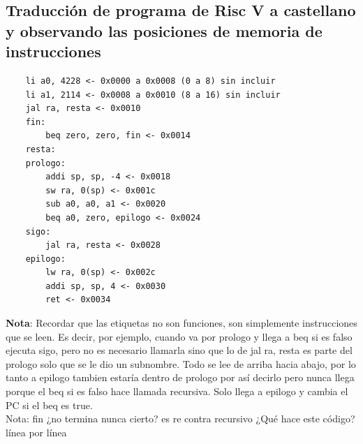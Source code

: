 \documentclass[10pt,a4paper]{article}
\begin{document}
\subsection*{Traducción de programa de Risc V a castellano y observando las posiciones de memoria de instrucciones}
\label{subsec:TPRVC}
\begin{lstlisting}
    li a0, 4228 <- 0x0000 a 0x0008 (0 a 8) sin incluir
    li a1, 2114 <- 0x0008 a 0x0010 (8 a 16) sin incluir
    jal ra, resta <- 0x0010
    fin: 
        beq zero, zero, fin <- 0x0014
    resta: 
    prologo:
        addi sp, sp, -4 <- 0x0018
        sw ra, 0(sp) <- 0x001c
        sub a0, a0, a1 <- 0x0020
        beq a0, zero, epilogo <- 0x0024
    sigo: 
        jal ra, resta <- 0x0028
    epilogo:
        lw ra, 0(sp) <- 0x002c
        addi sp, sp, 4 <- 0x0030
        ret <- 0x0034
\end{lstlisting}
\textbf{Nota}: Recordar que las etiquetas no son funciones, son simplemente instrucciones que se leen. Es decir, por ejemplo, cuando va por prologo y llega a beq si es falso ejecuta sigo, pero no es necesario llamarla sino que lo de jal ra, resta es parte del prologo solo que se le dio un subnombre. Todo se lee de arriba hacia abajo, por lo tanto a epilogo tambien estaría dentro de prologo por así decirlo pero nunca llega porque el beq si es falso hace llamada recursiva. Solo llega a epilogo y cambia el PC si el beq es true. \\ 
Nota: fin ¿no termina nunca cierto? es re contra recursivo
¿Qué hace este código? línea por línea
\end{document}
